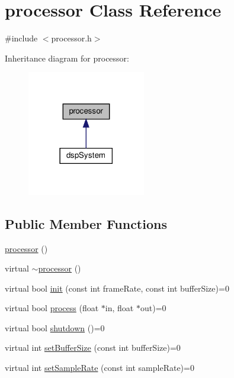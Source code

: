 \hypertarget{classprocessor}{}\section{processor Class Reference}
\label{classprocessor}


{\ttfamily \#include $<$processor.\+h$>$}



Inheritance diagram for processor\+:
\nopagebreak
\begin{figure}[H]
\begin{center}
\leavevmode
\includegraphics[width=146pt]{classprocessor__inherit__graph}
\end{center}
\end{figure}
\subsection*{Public Member Functions}
\begin{DoxyCompactItemize}
\item 
\hyperlink{classprocessor_acd50a60f927d1694433455e9f00d7ff3}{processor} ()
\item 
virtual \hyperlink{classprocessor_a1b31dd60915891a48e97a192d32919cb}{$\sim$processor} ()
\item 
virtual bool \hyperlink{classprocessor_ab320bfde3ea30e74e9055a7643113922}{init} (const int frame\+Rate, const int buffer\+Size)=0
\item 
virtual bool \hyperlink{classprocessor_a208b7490862424d1a487aa31b3520116}{process} (float $\ast$in, float $\ast$out)=0
\item 
virtual bool \hyperlink{classprocessor_aad3c0afc61e81dbf9cce91d358dca0bd}{shutdown} ()=0
\item 
virtual int \hyperlink{classprocessor_a1101feba5276acdadae9cd2d9b202421}{set\+Buffer\+Size} (const int buffer\+Size)=0
\item 
virtual int \hyperlink{classprocessor_afd94390f689bf421808cd413643befcf}{set\+Sample\+Rate} (const int sample\+Rate)=0
\end{DoxyCompactItemize}


